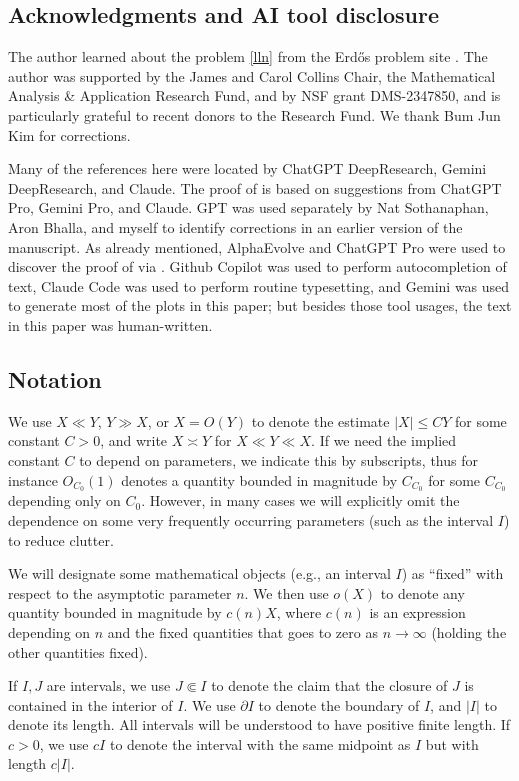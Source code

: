 \documentclass[12pt]{amsart}
\begin{document}
\subsection{Acknowledgments and AI tool disclosure}

The author learned about the problem \eqref{lln} from the Erd\H{o}s problem site \cite{bloom}. The author was supported by the James and Carol Collins Chair, the Mathematical Analysis \& Application Research Fund, and by NSF grant DMS-2347850, and is particularly grateful to recent donors to the Research Fund. We thank Bum Jun Kim for corrections.

Many of the references here were located by ChatGPT DeepResearch, Gemini DeepResearch, and Claude.  The proof of  is based on suggestions from ChatGPT Pro, Gemini Pro, and Claude.  GPT was used separately by Nat Sothanaphan, Aron Bhalla, and myself to identify corrections in an earlier version of the manuscript.  As already mentioned, AlphaEvolve and ChatGPT Pro were used to discover the proof of  via .  Github Copilot was used to perform autocompletion of text, Claude Code was used to perform routine typesetting, and Gemini was used to generate most of the plots in this paper; but besides those tool usages, the text in this paper was human-written.

\subsection{Notation} We use $X \ll Y$, $Y \gg X$, or $X = O(Y)$ to denote the estimate $|X| \leq CY$ for some constant $C>0$, and write $X \asymp Y$ for $X \ll Y \ll X$. If we need the implied constant $C$ to depend on parameters, we indicate this by subscripts, thus for instance $O_{C_0}(1)$ denotes a quantity bounded in magnitude by $C_{C_0}$ for some $C_{C_0}$ depending only on $C_0$.  However, in many cases we will explicitly omit the dependence on some very frequently occurring parameters (such as the interval $I$) to reduce clutter.

We will designate some mathematical objects (e.g., an interval $I$) as ``fixed'' with respect to the asymptotic parameter $n$.  We then use $o(X)$ to denote any quantity bounded in magnitude by $c(n) X$, where $c(n)$ is an expression depending on $n$ and the fixed quantities that goes to zero as $n \to \infty$ (holding the other quantities fixed).

If $I,J$ are intervals, we use $J \Subset I$ to denote the claim that the closure of $J$ is contained in the interior of $I$.  We use $\partial I$ to denote the boundary of $I$, and $|I|$ to denote its length.  All intervals will be understood to have positive finite length.  If $c>0$, we use $cI$ to denote the interval with the same midpoint as $I$ but with length $c|I|$.
\end{document}

